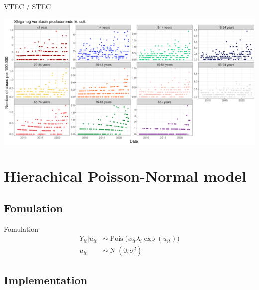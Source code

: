 \documentclass[aspectratio=169]{beamer}
\DeclareMathOperator{\N}{N}
\DeclareMathOperator{\Pois}{Pois}
\begin{document}
\begin{frame}{VTEC / STEC}
\tiny

\includegraphics[width=1\linewidth]{../figures/ShigaogveratoxinproducerendeEcolixAgeGroup}

\normalsize
\end{frame}

\hypertarget{hierachical-poisson-normal-model}{%
\section{Hierachical Poisson-Normal
model}\label{hierachical-poisson-normal-model}}

\hypertarget{fomulation}{%
\subsection{Fomulation}\label{fomulation}}

\begin{frame}{Fomulation}
\begin{subequations}
  \begin{alignat}{2}
    Y_{it}|u_{it} &\sim \Pois \big( w_{it} \lambda_{i} \exp(u_{it}) \big) \label{eq:pois_ln0} \\ 
    u_{it} &\sim \N(0,\sigma^2) \label{eq:pois_ln1}
  \end{alignat}
\end{subequations}
\end{frame}

\hypertarget{implementation}{%
\subsection{Implementation}\label{implementation}}
\end{document}
